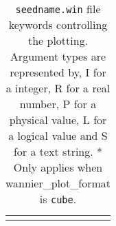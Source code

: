 \begin{longtable}{|c|c|p{6cm}|}
\hline
\caption[Parameter file keywords controlling plotting.]
{{\tt seedname.win} file keywords controlling the  plotting.  Argument types
are represented by, I for a integer, R for a real number, P for a
physical value, L for a logical value and S for a text string. * Only
applies when {\sc wannier\_plot\_format} is {\tt cube}.}
\label{parameter_keywords6}
\end{longtable}



